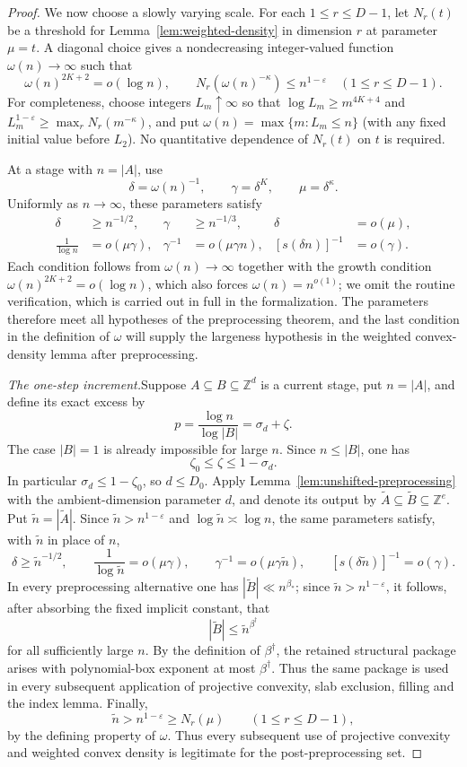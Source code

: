 \documentclass[11pt,reqno]{amsart}
\theoremstyle{definition}
\theoremstyle{remark}
\newcommand{\Z}{\mathbb Z}
\newcommand{\eps}{\varepsilon}
\begin{document}
\begin{proof}
We now choose a slowly varying scale.  For each $1\le r\le D-1$,
let $N_r(t)$ be a threshold for Lemma~\ref{lem:weighted-density} in
dimension $r$ at parameter $\mu=t$.  A diagonal choice gives a nondecreasing
integer-valued function $\omega(n)\to\infty$ such that
\[
 \omega(n)^{2K+2}=o(\log n),
 \qquad
 N_r(\omega(n)^{-\kappa})\le n^{1-\eps}
 \quad(1\le r\le D-1).
\]
For completeness, choose integers $L_m\uparrow\infty$ so that
$\log L_m\ge m^{4K+4}$ and
$L_m^{1-\eps}\ge\max_rN_r(m^{-\kappa})$, and put
$\omega(n)=\max\{m:L_m\le n\}$ (with any fixed initial value before
$L_2$).  No quantitative dependence of $N_r(t)$ on $t$ is required.

At a stage with $n=|A|$, use
\[
 \delta=\omega(n)^{-1},
 \qquad
 \gamma=\delta^K,
 \qquad
 \mu=\delta^\kappa.
\]
Uniformly as $n\to\infty$, these parameters satisfy
\begin{align*}
 \delta&\ge n^{-1/2},&
 \gamma&\ge n^{-1/3},&
 \delta&=o(\mu),\\
 \frac1{\log n}&=o(\mu\gamma),&
 \gamma^{-1}&=o(\mu\gamma n),&
 [s(\delta n)]^{-1}&=o(\gamma).
\end{align*}
Each condition follows from $\omega(n)\to\infty$ together with the growth
condition $\omega(n)^{2K+2}=o(\log n)$, which also forces
$\omega(n)=n^{o(1)}$; we omit the routine verification, which is carried
out in full in the formalization.  The parameters therefore meet all
hypotheses of the preprocessing theorem, and the last condition in the
definition of $\omega$ will supply the largeness hypothesis in the
weighted convex-density lemma after preprocessing.

\medskip\noindent\emph{The one-step increment.}\quad Suppose
$A\subseteq B\subseteq\Z^d$ is a current stage, put $n=|A|$, and define
its exact excess by
\[
 p=\frac{\log n}{\log|B|}=\sigma_d+\zeta.
\]
The case $|B|=1$ is already impossible for large $n$.  Since $n\le|B|$,
one has
\[
 \zeta_0\le\zeta\le1-\sigma_d.
\]
In particular $\sigma_d\le1-\zeta_0$, so $d\le D_0$.  Apply
Lemma~\ref{lem:unshifted-preprocessing} with the ambient-dimension parameter
$d$, and denote its output by
$\widetilde A\subseteq\widetilde B\subseteq\Z^e$.  Put
$\widetilde n=|\widetilde A|$.  Since
$\widetilde n>n^{1-\eps}$ and $\log\widetilde n\asymp\log n$, the same
parameters satisfy, with $\widetilde n$ in place of $n$,
\[
 \delta\ge\widetilde n^{-1/2},
 \qquad
 \frac1{\log\widetilde n}=o(\mu\gamma),
 \qquad
 \gamma^{-1}=o(\mu\gamma\widetilde n),
 \qquad
 [s(\delta\widetilde n)]^{-1}=o(\gamma).
\]
In every preprocessing alternative one has
$|\widetilde B|\ll n^{\beta_*}$; since
$\widetilde n>n^{1-\eps}$, it follows, after absorbing the fixed implicit
constant, that
\[
 |\widetilde B|\le \widetilde n^{\beta^\dagger}
\]
for all sufficiently large $n$.  By the definition of $\beta^\dagger$, the retained structural package
arises with polynomial-box exponent at most $\beta^\dagger$.  Thus the same
package is used in every subsequent
application of projective convexity, slab exclusion, filling and the index
lemma.  Finally,
\[
 \widetilde n>n^{1-\eps}
 \ge N_r(\mu)\qquad(1\le r\le D-1),
\]
by the defining property of $\omega$.  Thus every subsequent use of
projective convexity and weighted convex density is legitimate for the
post-preprocessing set.


\end{proof}
\end{document}
